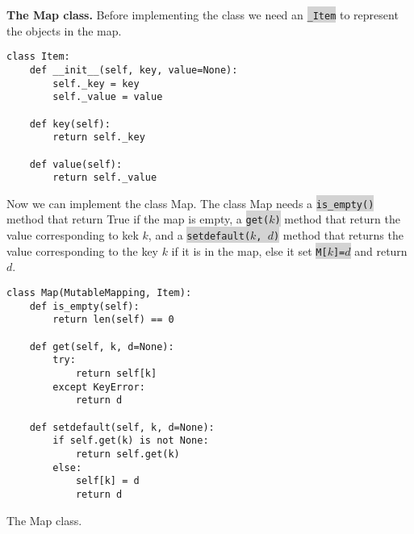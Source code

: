 \documentclass[10pt]{article}
\newcommand{\code}[1]{{\small\colorbox{LightGray}{\texttt{#1}}}}
\begin{document}
\textbf{The Map class.} Before implementing the class we need an \code{\_Item} to represent the objects in the map.
\begin{verbatim}
class Item:
    def __init__(self, key, value=None):
        self._key = key
        self._value = value
     
    def key(self):
        return self._key
        
    def value(self):
        return self._value
\end{verbatim}
Now we can implement the class Map. The class Map needs a \code{is\_empty()} method that return True if the map is empty, a \code{get($k$)} method that return the value corresponding to kek $k$, and a \code{setdefault($k$, $d$)} method that returns the value corresponding to the key $k$ if it is in the map, else it set \code{M[$k$]=$d$} and return $d$. 
\begin{listing}[ht]
\begin{verbatim}
class Map(MutableMapping, Item):
    def is_empty(self):
        return len(self) == 0
    
    def get(self, k, d=None):
        try:
            return self[k]
        except KeyError:
            return d
            
    def setdefault(self, k, d=None):
        if self.get(k) is not None:
            return self.get(k)
        else:
            self[k] = d
            return d
\end{verbatim}
	\caption{The Map class.}
	\label{listing:singly_linked_list_interface}
\end{listing}
\end{document}
